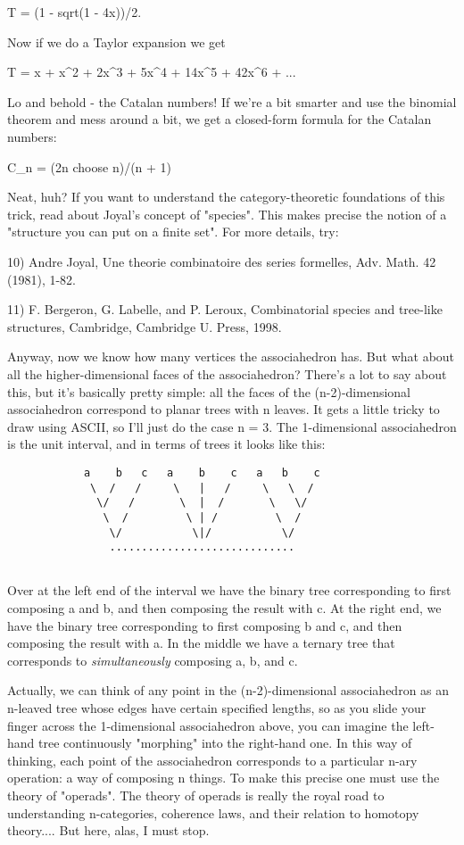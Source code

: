 T = (1 - sqrt(1 - 4x))/2.

Now if we do a Taylor expansion we get

T = x + x^{2} + 2x^{3} + 5x^{4} + 14x^{5} 
+ 42x^{6} + ...

Lo and behold - the Catalan numbers!  If we're a bit smarter and use 
the binomial theorem and mess around a bit, we get a closed-form 
formula for the Catalan numbers:

C_{n} = (2n choose n)/(n + 1)

Neat, huh?   If you want to understand the category-theoretic 
foundations of this trick, read about Joyal's concept of "species".
This makes precise the notion of a "structure you can put on a 
finite set".  For more details, try:

10) Andre Joyal, Une theorie combinatoire des series formelles, 
Adv. Math. 42 (1981), 1-82.

11) F. Bergeron, G. Labelle, and P. Leroux, Combinatorial species 
and tree-like structures, Cambridge, Cambridge U. Press, 1998.

Anyway, now we know how many vertices the associahedron has.  But
what about all the higher-dimensional faces of the associahedron?
There's a lot to say about this, but it's basically pretty simple:
all the faces of the (n-2)-dimensional associahedron correspond 
to planar trees with n leaves.   It gets a little tricky to draw
using ASCII, so I'll just do the case n = 3.  The 1-dimensional
associahedron is the unit interval, and in terms of trees it looks
like this:

\begin{verbatim}
            a    b   c   a    b    c   a   b    c
             \  /   /     \   |   /     \   \  / 
              \/   /       \  |  /       \   \/ 
               \  /         \ | /         \  /
                \/           \|/           \/
                .............................
 
\end{verbatim}
    
Over at the left end of the interval we have the binary tree 
corresponding to first composing a and b, and then composing the 
result with c.   At the right end, we have the binary tree 
corresponding to first composing b and c, and then composing the
result with a.  In the middle we have a ternary tree that 
corresponds to \emph{simultaneously} composing a, b, and c.

Actually, we can think of any point in the (n-2)-dimensional
associahedron as an n-leaved tree whose edges have certain specified
lengths, so as you slide your finger across the 1-dimensional
associahedron above, you can imagine the left-hand tree continuously
"morphing" into the right-hand one.  In this way of thinking,
each point of the associahedron corresponds to a particular n-ary
operation: a way of composing n things.  To make this precise one must
use the theory of "operads".  The theory of operads is really
the royal road to understanding n-categories, coherence laws, and their
relation to homotopy theory....  But here, alas, I must stop.

